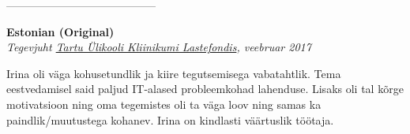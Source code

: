 \documentclass[a4paper, 12pt]{article}
\begin{document}
\begin{center}
\------------------------------------------
\end{center}

\begin{center}
\textbf{Estonian (Original)}\\
\textit{Tegevjuht \href{https://www.lastefond.ee}{Tartu Ülikooli Kliinikumi Lastefondis}, veebruar 2017}
\end{center}

Irina oli väga kohusetundlik ja kiire tegutsemisega vabatahtlik. Tema eestvedamisel said paljud IT-alased probleemkohad lahenduse. Lisaks oli tal kõrge motivatsioon ning oma tegemistes oli ta väga loov ning samas ka paindlik/muutustega kohanev. Irina on kindlasti väärtuslik töötaja.

\newpage
\end{document}
